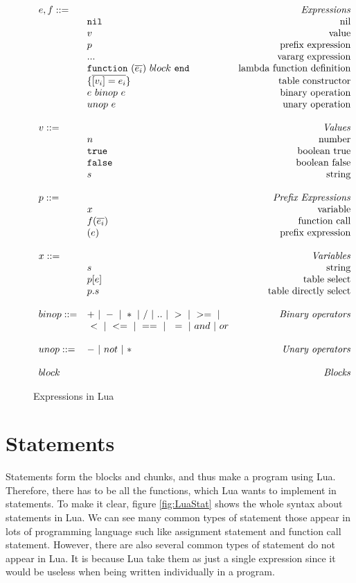 \begin{figure}
\caption{Expressions in Lua}
\label{fig:LuaExp}
\[
\begin{array}{llr}
  \mydefhead{e,f ::=\qquad\qquad\qquad\qquad}{Expressions}
  \mydefcase{\tt nil}{nil}
  \mydefcase{v}{value}
  \mydefcase{p}{prefix expression}
  \mydefcase{\tt ...}{vararg expression}
  \mydefcase{\functiondef e {block}}{lambda function definition}
  \mydefcase{\{\overline{[v_i] = e_i}\}}{table constructor}
  \mydefcase{e ~binop~ e}{binary operation}
  \mydefcase{unop~ e}{unary operation}
  \\
  \mydefhead{v ::=\qquad\qquad\qquad\qquad}{Values}
  \mydefcase{n}{number}
  \mydefcase{\tt true}{boolean true}
  \mydefcase{\tt false}{boolean false}
  \mydefcase{s}{string}
  \\
  \mydefhead{p ::=\qquad\qquad\qquad\qquad}{Prefix Expressions}
  \mydefcase{x}{variable}
  \mydefcase{f(\overline{e_i})}{function call}
  \mydefcase{(e)}{prefix expression}
  
  \\
  \mydefhead{x ::=\qquad\qquad\qquad\qquad}{Variables}
  \mydefcase{s}{string}
  \mydefcase{p[e]}{table select}
  \mydefcase{p.s}{table directly select}
  \\
  binop ::= & + ~|~ - ~|~ * ~|~ / ~|~ .. ~|~ > ~|~ >= ~|& \mbox{\emph{Binary operators}}\\
  \quad & ~ < ~|~ <= ~|~ == ~|~ ~= ~|~ and ~|~ or &  \\
  \\
  unop ::= & - ~|~ not ~|~ *  & \mbox{\emph{Unary operators}} \\
  \\
  \mydefhead{block \qquad\qquad\qquad\qquad}{Blocks}
\end{array}
\]
\end{figure}



\section{Statements}
Statements form the blocks and chunks, and thus make a program using Lua. Therefore, there has to be all the functions, which Lua wants to implement in statements. To make it clear, figure \ref{fig:LuaStat} shows the whole syntax about statements in Lua. We can see many common types of statement those appear in lots of programming language such like assignment statement and function call statement. However, there are also several common types of statement do not appear in Lua. It is because Lua take them as just a single expression since it would be useless when being written individually in a program.


